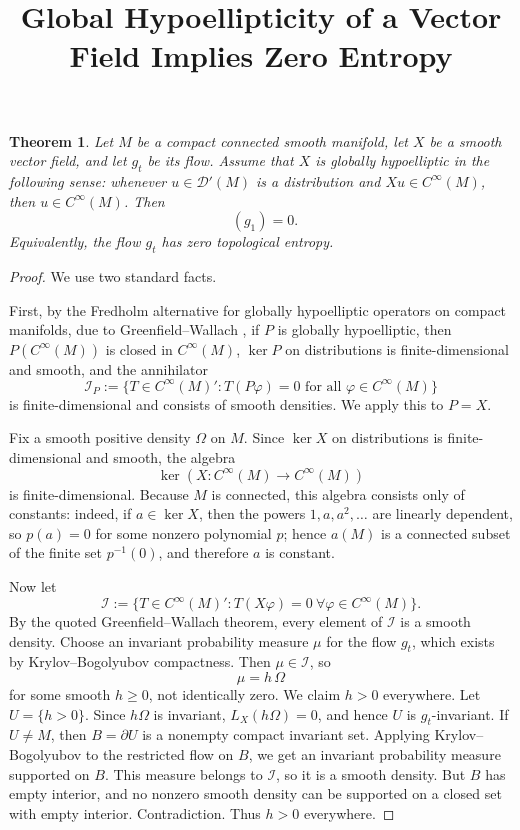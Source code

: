 \documentclass[11pt]{article}
\newtheorem{theorem}{Theorem}
\DeclareMathOperator{\htop}{h_{\mathrm{top}}}
\begin{document}
\title{Global Hypoellipticity of a Vector Field Implies Zero Entropy}
\author{}
\date{}
\maketitle

\begin{theorem}
Let \(M\) be a compact connected smooth manifold, let \(X\) be a smooth vector field, and let
\(g_t\) be its flow. Assume that \(X\) is globally hypoelliptic in the following sense: whenever
\(u\in \mathcal D'(M)\) is a distribution and \(Xu\in C^\infty(M)\), then \(u\in C^\infty(M)\).
Then
\[
\htop(g_1)=0.
\]
Equivalently, the flow \(g_t\) has zero topological entropy.
\end{theorem}

\begin{proof}
We use two standard facts.

First, by the Fredholm alternative for globally hypoelliptic operators on compact manifolds, due to Greenfield--Wallach \cite{GW}, if \(P\) is globally hypoelliptic, then \(P(C^\infty(M))\) is closed in \(C^\infty(M)\), \(\ker P\) on distributions is finite-dimensional and smooth, and the annihilator
\[
\mathcal I_P:=\{T\in C^\infty(M)' : T(P\varphi)=0 \text{ for all } \varphi\in C^\infty(M)\}
\]
is finite-dimensional and consists of smooth densities. We apply this to \(P=X\).

Fix a smooth positive density \(\Omega\) on \(M\). Since \(\ker X\) on distributions is finite-dimensional and smooth, the algebra
\[
\ker(X:C^\infty(M)\to C^\infty(M))
\]
is finite-dimensional. Because \(M\) is connected, this algebra consists only of constants: indeed, if \(a\in \ker X\), then the powers \(1,a,a^2,\dots\) are linearly dependent, so \(p(a)=0\) for some nonzero polynomial \(p\); hence \(a(M)\) is a connected subset of the finite set \(p^{-1}(0)\), and therefore \(a\) is constant.

Now let
\[
\mathcal I:=\{T\in C^\infty(M)' : T(X\varphi)=0 \ \forall \varphi\in C^\infty(M)\}.
\]
By the quoted Greenfield--Wallach theorem, every element of \(\mathcal I\) is a smooth density. Choose an invariant probability measure \(\mu\) for the flow \(g_t\), which exists by Krylov--Bogolyubov compactness. Then \(\mu\in \mathcal I\), so
\[
\mu=h\,\Omega
\]
for some smooth \(h\ge 0\), not identically zero. We claim \(h>0\) everywhere. Let \(U=\{h>0\}\). Since \(h\Omega\) is invariant, \(L_X(h\Omega)=0\), and hence \(U\) is \(g_t\)-invariant. If \(U\neq M\), then \(B=\partial U\) is a nonempty compact invariant set. Applying Krylov--Bogolyubov to the restricted flow on \(B\), we get an invariant probability measure supported on \(B\). This measure belongs to \(\mathcal I\), so it is a smooth density. But \(B\) has empty interior, and no nonzero smooth density can be supported on a closed set with empty interior. Contradiction. Thus \(h>0\) everywhere.


\end{proof}
\end{document}
